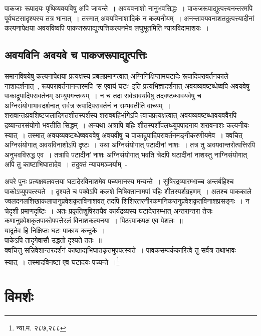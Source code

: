 	पाकजाः रूपादयः पृथिव्यवयविषु अपि जायन्ते~। अवयवनाशो नानुभवसिद्धः~। पाकजरूपाद्युत्पत्त्यनन्तरमपि पूर्वघटसादृश्यस्य तत्र भानात्~। तस्मात् अवयविनाशादिकं न कल्पनीयम्~। अनन्तावयवनाशतदुत्पत्त्यादीनां कल्पनापेक्षया अवयविष्वपि पाकजरूपाद्युत्पत्तिकल्पनमेव लघुभूतमिति न्यायविदामाशयः~।

		\subsection{अवयविनि अवयवे च पाकजरूपाद्युत्पत्तिः}

		समानविषयेषु कल्पनापेक्षया प्रत्यक्षस्य प्रबलप्रमाणत्वात् अग्निनिक्षिप्तामघटादेः रूपादिपरावर्तनकाले नाशादर्शनात्~, रूपपरावर्तनानन्तरमपि 'स एवायं घटः' इति प्रत्यभिज्ञादर्शनात् अवयव्यवष्टब्धेष्वपि अवयवेषु पाकाद्रूपादिपरावर्तनम् अभ्युपगन्तव्यम्~। न च तदा सर्वत्रावयविषु तदवष्टब्धावयवेषु च अग्निसंयोगाभावदर्शनात् सर्वत्र रूपादिपरावर्तनं न सम्भवतीति वाच्यम्~। शरावान्तःप्रवशिष्टजलादिगतशीतस्पर्शस्य शरावबहिर्भागेऽपि त्वाचप्रत्यक्षत्वात् अवयव्यवष्टब्धावयववैरपि द्रव्यान्तरसंयोगो भवतीति सिद्धम्~। अन्यथा अत्रापि बहिः शीतस्पर्शोपलब्ध्युपपादनाय शरावनाशः कल्पनीयः स्यात्~। तस्मात् अवयव्यवष्टब्धेष्ववयवेषु अवयवीषु च पाकाद्रूपादिपरावर्तनमङ्गीकरणीयमेव~। क्वचित् अग्निसंयोगात् अवयविनाशोऽपि दृष्टः~। यथा अग्निसंयोगात् पटादीनां नाशः~।  तत्र तु अवयवान्तरोत्पत्तिरपि अनुभवविरुद्ध एव~। तत्रापि पटादीनां नाशः‌ अग्निसंयोगात् भवति चेदपि घटादीनां नाशस्तु नाग्निसंयोगात् अपि तु काष्टाभिघातादेव~। तदुक्तं न्यायमञ्जर्याम्~-

		{\fontsize{11.7}{0}\selectfont\s अपरे पुनः प्रत्यक्षबलवत्तया घटादेरविनाशमेव पच्यमानस्य मन्यन्ते~। सुषिरद्रव्यारम्भाच्च अन्तर्बहिश्च पाकोऽप्युपपत्स्यते~। दृश्यते च पक्वेऽपि कलशे निषिक्तानामपां बहिः शीतस्पर्शग्रहणम्~। अतश्च पाककाले ज्वलदनलशिखाकलापानुप्रवेशकृतविनाशवत् तदपि शिशिरतरनीरकणनिकरानुप्रवेशकृतविनाशप्रसङ्गः~। न चेदृशी प्रमाणदृष्टिः~। अतः प्रकृतिशुषिरतयैव कार्यद्रव्यस्य घटादेरारम्भात् अन्तरान्तरा तेजः कणानुप्रवेशकृतपाकोपपत्तेरलं विनाशकल्पनया~। पिठरपाकपक्ष एव पेशलः~॥\\ यादृतेव हि निक्षिप्तः घटः पाकाय कन्दुके~।\\ पाकेऽपि तादृगेवासौ उद्धतो दृश्यते ततः~॥\\ क्वचित्तु सन्निवेशान्तरदर्शनं काष्ठाद्यभिघातकृतमुपपत्स्यते~। पावकसम्पर्ककारित्वे तु सर्वत्र तथाभावः स्यात्~। तस्मादविनष्टा एव घटादयः पच्यन्ते~।\footnote{न्या.म. २८७,२८८}}

	\section{विमर्शः}

